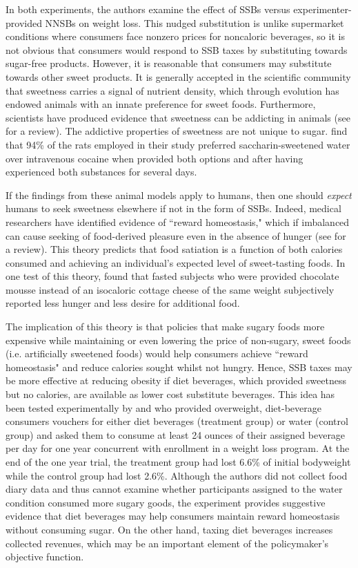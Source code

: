 \documentclass[12pt]{article}
\begin{document}
In both experiments, the authors examine the effect of SSBs versus experimenter-provided NNSBs on weight loss. This nudged substitution is unlike supermarket conditions where consumers face nonzero prices for noncaloric beverages, so it is not obvious that consumers would respond to SSB taxes by substituting towards sugar-free products. However, it is reasonable that consumers may substitute towards other sweet products. It is generally accepted in the scientific community that sweetness carries a signal of nutrient density, which through evolution has endowed animals with an innate preference for sweet foods. Furthermore, scientists have produced evidence that sweetness can be addicting in animals (see \textcite{avena2008evidence} for a review). The addictive properties of sweetness are not unique to sugar. \textcite{lenoir2007intense} find that 94\% of the rats employed in their study preferred saccharin-sweetened water over intravenous cocaine when provided both options and after having experienced both substances for several days.

If the findings from these animal models apply to humans, then one should \textit{expect} humans to seek sweetness elsewhere if not in the form of SSBs. Indeed, medical researchers have identified evidence of ``reward homeostasis," which if imbalanced can cause seeking of food-derived pleasure even in the absence of hunger (see \textcite{bellisle2012sweetness} for a review). This theory predicts that food satiation is a function of both calories consumed and achieving an individual's expected level of sweet-tasting foods. In one test of this theory, \textcite{lemmens2009eating} found that fasted subjects who were provided chocolate mousse instead of an isocaloric cottage cheese of the same weight subjectively reported less hunger and less desire for additional food.

The implication of this theory is that policies that make sugary foods more expensive while maintaining or even lowering the price of non-sugary, sweet foods (i.e. artificially sweetened foods) would help consumers achieve ``reward homeostasis" and reduce calories sought whilst not hungry. Hence, SSB taxes may be more effective at reducing obesity if diet beverages, which provided sweetness but no calories, are available as lower cost substitute beverages. This idea has been tested experimentally by  \textcite{peters2014effects} and \textcite{peters2016effects} who provided overweight, diet-beverage consumers vouchers for either diet beverages (treatment group) or water (control group) and asked them to consume at least 24 ounces of their assigned beverage per day for one year concurrent with enrollment in a weight loss program. At the end of the one year trial, the treatment group had lost 6.6\% of initial bodyweight while the control group had lost 2.6\%. Although the authors did not collect food diary data and thus cannot examine whether participants assigned to the water condition consumed more sugary goods, the experiment provides suggestive evidence that diet beverages may help consumers maintain reward homeostasis without consuming sugar. On the other hand, taxing diet beverages increases collected revenues, which may be an important element of the policymaker's objective function.
\end{document}
